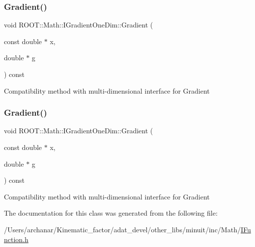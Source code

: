 \subsubsection{\texorpdfstring{Gradient()}{Gradient()}\hspace{0.1cm}{\footnotesize\ttfamily [1/2]}}
{\footnotesize\ttfamily void R\+O\+O\+T\+::\+Math\+::\+I\+Gradient\+One\+Dim\+::\+Gradient (\begin{DoxyParamCaption}\item[{const double $\ast$}]{x,  }\item[{double $\ast$}]{g }\end{DoxyParamCaption}) const\hspace{0.3cm}{\ttfamily [inline]}}

Compatibility method with multi-\/dimensional interface for Gradient \mbox{\label{classROOT_1_1Math_1_1IGradientOneDim_ac00c2cdc7a93ea4358f2f1df8e3499eb}} 
\subsubsection{\texorpdfstring{Gradient()}{Gradient()}\hspace{0.1cm}{\footnotesize\ttfamily [2/2]}}
{\footnotesize\ttfamily void R\+O\+O\+T\+::\+Math\+::\+I\+Gradient\+One\+Dim\+::\+Gradient (\begin{DoxyParamCaption}\item[{const double $\ast$}]{x,  }\item[{double $\ast$}]{g }\end{DoxyParamCaption}) const\hspace{0.3cm}{\ttfamily [inline]}}

Compatibility method with multi-\/dimensional interface for Gradient 

The documentation for this class was generated from the following file\+:\begin{DoxyCompactItemize}
\item 
/\+Users/archanar/\+Kinematic\+\_\+factor/adat\+\_\+devel/other\+\_\+libs/minuit/inc/\+Math/\mbox{\hyperlink{other__libs_2minuit_2inc_2Math_2IFunction_8h}{I\+Function.\+h}}\end{DoxyCompactItemize}
